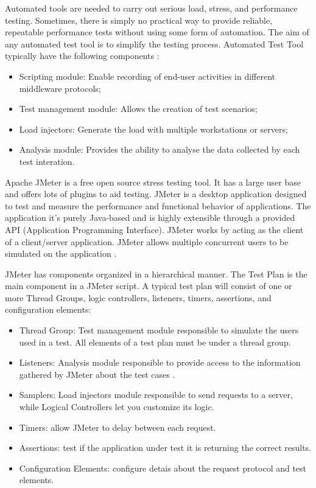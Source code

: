 Automated tools are needed to carry out serious load, stress, and performance testing. Sometimes, there is simply no practical way to provide reliable, repeatable performance tests without using some form of automation. The aim of any automated test tool is to simplify the testing process. Automated Test Tool  typically have the following components \cite{Molyneaux2009}:

\begin{itemize}
\item Scripting module: Enable recording of end-user activities in different middleware protocols;
\item Test management module: Allows the creation of test scenarios;
\item Load injectors: Generate the load with multiple workstations or servers;
\item Analysis module: Provides the ability to analyse the data collected by each test interation.
\end{itemize}

Apache JMeter is a free open source stress testing tool.  It has a large user base and offers lots of plugins to aid testing. JMeter is a desktop application designed to test and measure the performance and functional behavior of applications. The application it's purely Java-based and is highly extensible through a provided API (Application Programming Interface). JMeter works by acting as the client of a client/server application. JMeter allows multiple concurrent users to be simulated on the application \cite{Halili2008} \cite{Erinle2013}. 

JMeter has components organized  in a hierarchical manner. The Test Plan is the main component in a JMeter script. A typical test plan will consist of one or more Thread Groups, logic controllers, listeners, timers, assertions, and configuration elements:

\begin{itemize}
\item Thread Group: Test management module responsible to simulate the users used in a test. All elements of a test plan must be under a thread group.
\item Listeners: Analysis module responsible to provide access to the information gathered by JMeter about the test cases .
\item Samplers: Load injectors module responsible to send requests to a server, while Logical Controllers let you customize its logic.
\item Timers: allow JMeter to delay between each request.
\item Assertions: test if the application under test it is returning the correct results.
\item Configuration Elements: configure detais about the request protocol and test elements.
\end{itemize}



